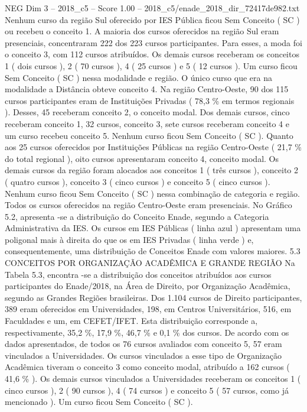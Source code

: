 \begin{textsample}{NEG Dim 3 – 2018\_c5 – Score 1.00 – 2018\_c5/enade\_2018\_dir\_72417de982.txt}
Nenhum curso da região Sul oferecido por IES Pública ficou Sem Conceito ( SC ) ou recebeu o conceito 1.
A maioria dos cursos oferecidos na região Sul eram presenciais, concentraram 222 dos 223 cursos participantes.
Para esses, a moda foi o conceito 3, com 112 cursos atribuídos.
Os demais cursos receberam os conceitos 1 ( dois cursos ), 2 ( 70 cursos ), 4 ( 25 cursos ) e 5 ( 12 cursos ).
Um curso ficou Sem Conceito ( SC ) nessa modalidade e região.
O único curso que era na modalidade a Distância obteve conceito 4.
Na região Centro-Oeste, 90 dos 115 cursos participantes eram de Instituições Privadas ( 78,3 \% em termos regionais ).
Desses, 45 receberam conceito 2, o conceito modal.
Dos demais cursos, cinco receberam conceito 1, 32 cursos, conceito 3, sete cursos receberam conceito 4 e um curso recebeu conceito 5.
Nenhum curso ficou Sem Conceito ( SC ).
Quanto aos 25 cursos oferecidos por Instituições Públicas na região Centro-Oeste ( 21,7 \% do total regional ), oito cursos apresentaram conceito 4, conceito modal.
Os demais cursos da região foram alocados aos conceitos 1 ( três cursos ), conceito 2 ( quatro cursos ), conceito 3 ( cinco cursos ) e conceito 5 ( cinco cursos ).
Nenhum curso ficou Sem Conceito ( SC ) nessa combinação de categoria e região.
Todos os cursos oferecidos na região Centro-Oeste eram presenciais.
No Gráfico 5.2, apresenta -se a distribuição do Conceito Enade, segundo a Categoria Administrativa da IES.
Os cursos em IES Públicas ( linha azul ) apresentam uma poligonal mais à direita do que os em IES Privadas ( linha verde ) e, consequentemente, uma distribuição de Conceitos Enade com valores maiores. 5.3 CONCEITOS POR ORGANIZAÇÃO ACADÊMICA E GRANDE REGIÃO Na Tabela 5.3, encontra -se a distribuição dos conceitos atribuídos aos cursos participantes do Enade/2018, na Área de Direito, por Organização Acadêmica, segundo as Grandes Regiões brasileiras.
Dos 1.104 cursos de Direito participantes, 389 eram oferecidos em Universidades, 198, em Centros Universitários, 516, em Faculdades e um, em CEFET/IFET.
Esta distribuição corresponde a, respectivamente, 35,2 \%, 17,9 \%, 46,7 \% e 0,1 \% dos cursos.
De acordo com os dados apresentados, de todos os 76 cursos avaliados com conceito 5, 57 eram vinculados a Universidades.
Os cursos vinculados a esse tipo de Organização Acadêmica tiveram o conceito 3 como conceito modal, atribuído a 162 cursos ( 41,6 \% ).
Os demais cursos vinculados a Universidades receberam os conceitos 1 ( cinco cursos ), 2 ( 90 cursos ), 4 ( 74 cursos ) e conceito 5 ( 57 cursos, como já mencionado ).
Um curso ficou Sem Conceito ( SC ).

\end{textsample}
